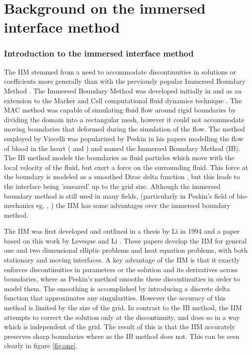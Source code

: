 \part{Background on the immersed interface method}
\section{Introduction to the immersed interface method}
The IIM stemmed from a need to accommodate discontinuities in solutions or coefficients more generally than with the previously popular Immersed Boundary Method \cite{levequeli94}.
The Immersed Boundary Method was developed initially in \cite{viecelli69} and \cite{viecelli71} as an extension to the Marker and Cell computational fluid dynamics technique \cite{welch66}.
The MAC method was capable of simulating fluid flow around rigid boundaries by dividing the domain into a rectangular mesh, however it could not accommodate moving boundaries that deformed during the simulation of the flow.
The method employed by Viecelli was popularized by Peskin in his papers modelling the flow of blood in the heart (\cite{peskin72} and \cite{peskin77}) and named the Immersed Boundary Method (IB).
The IB method models the boundaries as fluid particles which move with the local velocity of the fluid, but exert a force on the surrounding fluid. This force at the boundary is modeled as a smoothed Dirac delta function \cite{peskin02}, but this leads to the interface being 'smeared' up to the grid size.
Although the immersed boundary method is still used in many fields, (particularly in Peskin's field of bio-mechanics eg. \cite{heys07}, \cite{yakhot05}) the IIM has some advantages over the immersed boundary method.

The IIM was first developed and outlined in a thesis by Li in 1994 \cite{li94} and a paper based on this work by Leveque and Li \cite{levequeli94}.
These papers develop the IIM for general one and two dimensional elliptic problems and heat equation problems, with both stationary and moving interfaces.
A key advantage of the IIM is that it exactly enforces discontinuities in parameters or the solution and its derivatives across boundaries, where as Peskin's method smooths these discontinuities in order to model them.
The smoothing is accomplished by introducing a discrete delta function that approximates any singularities.
However the accuracy of this method is limited by the size of the grid.
In contrast to the IB method, the IIM attempts to correct the solution only at the discontinuity, and does so in a way which is independent of the grid.
The result of this is that the IIM accurately preserves sharp boundaries where as the IB method does not.
This can be seen clearly in figure \ref{fig:one}.

